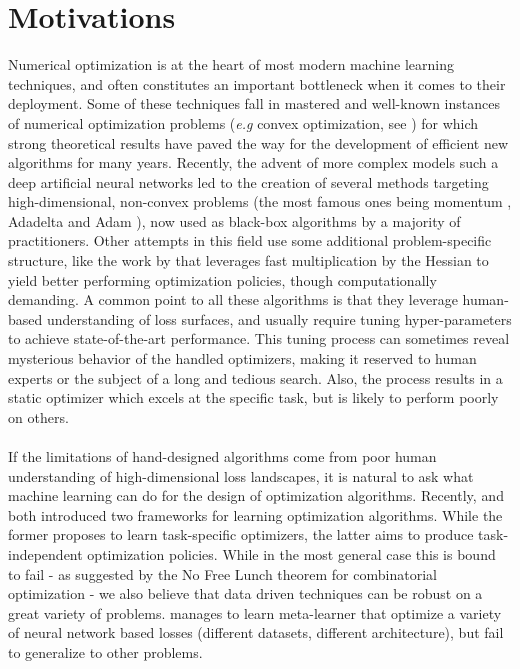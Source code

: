 {{		}

		\section{Motivations}
		{
			Numerical optimization is at the heart of most modern machine learning techniques, and often constitutes an important bottleneck when it comes to their deployment. Some of these techniques fall in mastered and well-known instances of numerical optimization problems (\emph{e.g} convex optimization, see \cite{nocedal2006numerical}) for which strong theoretical results have paved the way for the development of efficient new algorithms for many years. Recently, the advent of more complex models such a deep artificial neural networks led to the creation of several methods targeting high-dimensional, non-convex problems (the most famous ones being momentum \cite{nesterov1983method}, Adadelta \cite{zeiler2012adadelta} and Adam \cite{kingma2014adam}), now used as black-box algorithms by a majority of practitioners. Other attempts in this field use some additional problem-specific structure, like the work by \cite{martens2010deep} that leverages fast multiplication by the Hessian to yield better performing optimization policies, though computationally demanding. A common point to all these algorithms is that they leverage human-based understanding of loss surfaces, and usually require tuning hyper-parameters to achieve state-of-the-art performance. This tuning process can sometimes reveal mysterious behavior of the handled optimizers, making it reserved to human experts or the subject of a long and tedious search. Also, the process results in a static optimizer which excels at the specific task, but is likely to perform poorly on others. 
	
	\paragraph{}
	If the limitations of hand-designed algorithms come from poor human understanding of high-dimensional loss landscapes, it is natural to ask what machine learning can do for the design of optimization algorithms. Recently, \cite{andrychowicz2016learning} and \cite{li2016learning} both introduced two frameworks for learning optimization algorithms. While the former proposes to learn task-specific optimizers, the latter aims to produce task-independent optimization policies. While in the most general case this is bound to fail - as suggested by the No Free Lunch theorem for combinatorial optimization \cite{wolpert1997no} - we also believe that data driven techniques can be robust on a great variety of problems. \cite{li2016learning} manages to learn meta-learner that optimize a variety of neural network based losses (different datasets, different architecture), but fail to generalize to other problems. 
	
}}
